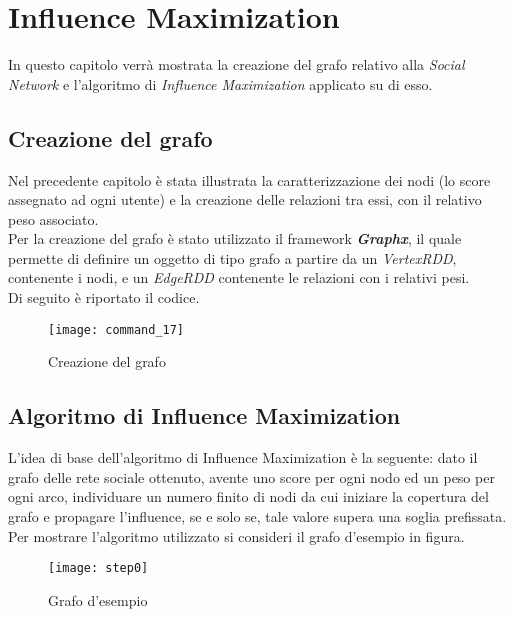 
\chapter{Influence Maximization}
In questo capitolo verrà mostrata la creazione del grafo relativo alla \textit{Social Network}
e l'algoritmo di \textit{Influence Maximization} applicato su di esso.

\section{Creazione del grafo}
Nel precedente capitolo è stata illustrata la caratterizzazione dei nodi (lo score
assegnato ad ogni utente) e la creazione delle relazioni tra essi, con il relativo
peso associato.\\
Per la creazione del grafo è stato utilizzato il framework \textit{\textbf{Graphx}},
il quale permette di definire un oggetto di tipo grafo a partire da un \textit{VertexRDD},
contenente i nodi, e un \textit{EdgeRDD} contenente le relazioni con i relativi pesi.\\
Di seguito è riportato il codice.

\begin{figure}[!htbp]
	\texttt{[image: command\_17]}
	\caption{Creazione del grafo}
	\label{command_17}
\end{figure}
\clearpage

\section{Algoritmo di Influence Maximization}
L'idea di base dell'algoritmo di Influence Maximization è la seguente: dato il
grafo delle rete sociale ottenuto, avente uno score per ogni nodo ed un peso per
ogni arco, individuare un numero finito di nodi da cui iniziare la copertura del
grafo e propagare l'influence, se e solo se, tale valore supera una soglia prefissata.\\
Per mostrare l'algoritmo utilizzato si consideri il grafo d'esempio in figura.

\begin{figure}[!htbp]
  \begin{center}
    \texttt{[image: step0]}
  	\caption{Grafo d'esempio}
  	\label{step0}
  \end{center}
\end{figure}

